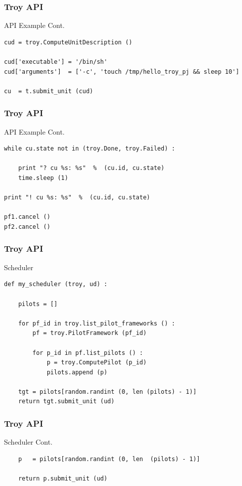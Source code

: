 \documentclass{beamer}
\begin{document}
\begin{frame}[fragile] 
 \frametitle{Troy API}
 {\footnotesize
  \begin{block}{API Example Cont.}
\begin{verbatim}
cud = troy.ComputeUnitDescription ()

cud['executable'] = '/bin/sh'
cud['arguments']  = ['-c', 'touch /tmp/hello_troy_pj && sleep 10']

cu  = t.submit_unit (cud)
\end{verbatim}
  \end{block}
 }
\end{frame}

\begin{frame}[fragile] 
 \frametitle{Troy API}
 {\footnotesize
  \begin{block}{API Example Cont.}
\begin{verbatim}
while cu.state not in (troy.Done, troy.Failed) :

    print "? cu %s: %s"  %  (cu.id, cu.state)
    time.sleep (1)

print "! cu %s: %s"  %  (cu.id, cu.state)

pf1.cancel ()
pf2.cancel ()
\end{verbatim}
  \end{block}
 }
\end{frame}

\begin{frame}[fragile] 
 \frametitle{Troy API}
 {\footnotesize
  \begin{block}{Scheduler}
\begin{verbatim}
def my_scheduler (troy, ud) :

    pilots = []

    for pf_id in troy.list_pilot_frameworks () :
        pf = troy.PilotFramework (pf_id)

        for p_id in pf.list_pilots () :
            p = troy.ComputePilot (p_id)
            pilots.append (p)

    tgt = pilots[random.randint (0, len (pilots) - 1)]
    return tgt.submit_unit (ud)
\end{verbatim}
  \end{block}
 }
\end{frame}

\begin{frame}[fragile] 
 \frametitle{Troy API}
 {\footnotesize
  \begin{block}{Scheduler  Cont.}
   \begin{verbatim}
    p   = pilots[random.randint (0, len  (pilots) - 1)]

    return p.submit_unit (ud)
   \end{verbatim}
  \end{block}
 }
\end{frame}
\end{document}
